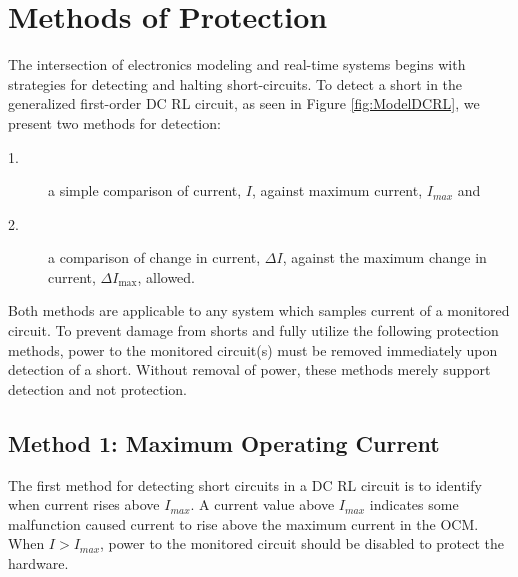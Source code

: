 \documentclass[11pt,oneside]{report}
\begin{document}
    \chapter{Methods of Protection}\label{chap:method of protection}
    The intersection of electronics modeling and real-time systems begins with strategies for detecting and halting short-circuits. To detect a short in the generalized first-order DC RL circuit, as seen in Figure \ref{fig:ModelDCRL}, we present two methods for detection:
    \begin{description}
    \item [1.] a simple comparison of current, $I$, against maximum current, $I_{max}$ and
    \item [2.] a comparison of change in current, $\Delta I$, against the maximum change in current, $\Delta I_{\max}$, allowed.
    \end{description}
    Both methods are applicable to any system which samples current of a monitored circuit. To prevent damage from shorts and fully utilize the following protection methods, power to the monitored circuit(s) must be removed immediately upon detection of a short. Without removal of power, these methods merely support detection and not protection.
    \section{Method 1: Maximum Operating Current}
    The first method for detecting short circuits in a DC RL circuit is to identify when current rises above $I_{max}$. A current value above $I_{max}$ indicates some malfunction caused current to rise above the maximum current in the OCM. When $I > I_{max}$, power to the monitored circuit should be disabled to protect the hardware.
\end{document}
